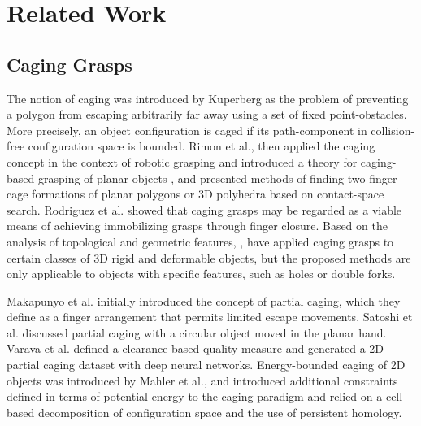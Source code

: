 \documentclass[conference]{IEEEtran}
\begin{document}
\section{Related Work}

\subsection{Caging Grasps}
The notion of caging was introduced by Kuperberg\cite{b1} as the problem of preventing a polygon from escaping arbitrarily far away using a set of fixed point-obstacles. More precisely, an object configuration is caged if its path-component in collision-free configuration space is bounded. Rimon et al.\cite{b2}, \cite{b3} then applied the caging concept in the context of robotic grasping and introduced a theory for caging-based grasping of planar objects \cite{b4}, \cite{b5} and presented methods of finding two-finger cage formations of planar polygons or 3D polyhedra based on contact-space search. 
Rodriguez et al. \cite{b7} showed that caging grasps may be regarded as a viable means of achieving immobilizing grasps through finger closure. 
Based on the analysis of topological and geometric features, \cite{b9}, \cite{b8} have applied caging grasps to certain classes of 3D rigid and deformable objects, but the proposed methods are only applicable to objects with specific features, such as holes or double forks. 

Makapunyo et al. \cite{b10} initially introduced the concept of partial caging, which they define as a finger arrangement that permits limited escape movements.
Satoshi et al. \cite{} discussed partial caging with a circular object moved in the planar hand. 
Varava et al. \cite{b11} \cite{} defined a clearance-based quality measure and generated a 2D partial caging dataset with deep neural networks.
Energy-bounded caging of 2D objects was introduced by Mahler et al.\cite{b12}, \cite{b13} and introduced additional constraints defined in terms of potential energy to the caging paradigm and relied on a cell-based decomposition of configuration space and the use of persistent homology. 
\end{document}
